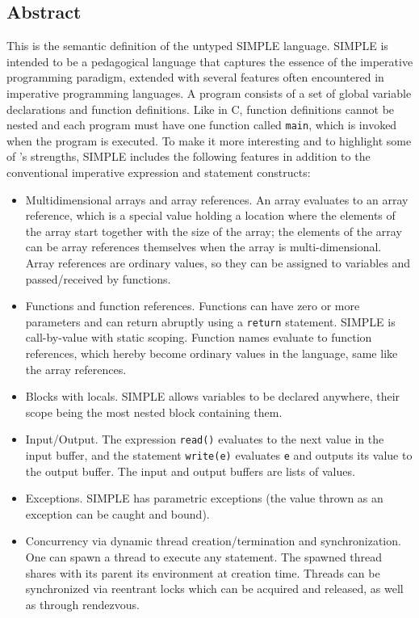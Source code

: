 \begin{latexComment}
\section{Abstract}
This is the \K semantic definition of the untyped SIMPLE language.
SIMPLE is intended to be a pedagogical language that captures the
essence of the imperative programming paradigm, extended with several
features often encountered in imperative programming languages.
A program consists of a set of global variable declarations and
function definitions.  Like in C, function definitions cannot be
nested and each program must have one function called \texttt{main},
which is invoked when the program is executed.  To make it more
interesting and to highlight some of \K's strengths, SIMPLE includes
the following features in addition to the conventional imperative
expression and statement constructs:
\begin{itemize}
\item Multidimensional arrays and array references.  An array evaluates
to an array reference, which is a special value holding a location where
the elements of the array start together with the size of the array;
the elements of the array can be array references themselves when the
array is multi-dimensional.  Array references are ordinary values, so
they can be assigned to variables and passed/received by functions.
\item Functions and function references.  Functions can have zero or
more parameters and can return abruptly using a \texttt{return} statement.
SIMPLE is call-by-value with static scoping.  Function names evaluate to
function references, which hereby become ordinary values in the language,
same like the array references.
\item Blocks with locals.  SIMPLE allows variables to be declared
anywhere, their scope being the most nested block containing them.
\item Input/Output.  The expression \texttt{read()} evaluates to the
next value in the input buffer, and the statement \texttt{write(e)}
evaluates \texttt{e} and outputs its value to the output buffer.  The
input and output buffers are lists of values.
\item Exceptions.  SIMPLE has parametric exceptions (the value thrown as
an exception can be caught and bound).
\item Concurrency via dynamic thread creation/termination and
synchronization.  One can spawn a thread to execute any statement.
The spawned thread shares with its parent its environment at creation time.
Threads can be synchronized via reentrant locks which can be acquired and
released, as well as through rendezvous.


\end{itemize}
\end{latexComment}

